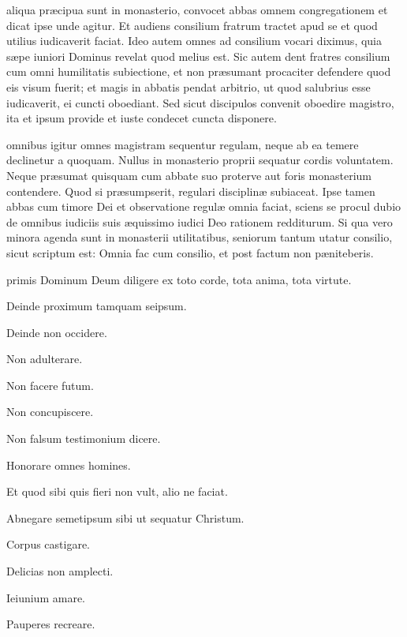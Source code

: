 \documentclass[fontsize=9pt,paper=A6,twoside,BCOR=1mm,DIV=22,headinclude]{scrarticle}
\begin{document}
\begin{multicols}{2}
 aliqua præcipua sunt in monasterio, convocet abbas omnem congregationem et dicat ipse unde agitur. Et audiens consilium fratrum tractet apud se et quod utilius iudicaverit faciat. Ideo autem omnes ad consilium vocari diximus, quia sæpe iuniori Dominus revelat quod melius est. Sic autem dent fratres consilium cum omni humilitatis subiectione, et non præsumant procaciter defendere quod eis visum fuerit; et magis in abbatis pendat arbitrio, ut quod salubrius esse iudicaverit, ei cuncti oboediant. Sed sicut discipulos convenit oboedire magistro, ita et ipsum provide et iuste condecet cuncta disponere.

 omnibus igitur omnes magistram sequentur regulam, neque ab ea temere declinetur a quoquam. Nullus in monasterio proprii sequatur cordis voluntatem. Neque præsumat quisquam cum abbate suo proterve aut foris monasterium contendere. Quod si præsumpserit, regulari disciplinæ subiaceat. Ipse tamen abbas cum timore Dei et observatione regulæ omnia faciat, sciens se procul dubio de omnibus iudiciis suis æquissimo iudici Deo rationem redditurum. Si qua vero minora agenda sunt in monasterii utilitatibus, seniorum tantum utatur consilio, sicut scriptum est: Omnia fac cum consilio, et post factum non pæniteberis. 

\begin{psalmus}
 primis Dominum Deum diligere ex toto corde, tota anima, tota virtute. 

Deinde proximum tamquam seipsum. 

Deinde non occidere. 

Non adulterare. 

Non facere futum.

Non concupiscere. 

Non falsum testimonium dicere. 

Honorare omnes homines. 

Et quod sibi quis fieri non vult, alio ne faciat. 

Abnegare semetipsum sibi ut sequatur Christum. 

Corpus castigare. 

Delicias non amplecti. 

Ieiunium amare. 

Pauperes recreare.


\end{psalmus}
\end{multicols}
\end{document}
